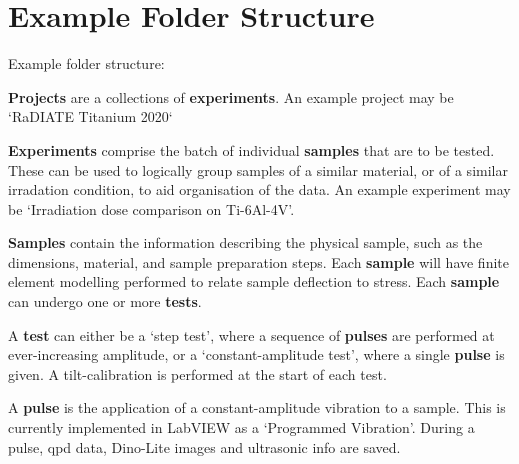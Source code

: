 \documentclass{article}
\begin{document}
\section{Example Folder Structure}

Example folder structure:


\begin{itemize}
  \item{
    \textbf{Projects} are a collections of \textbf{experiments}.
    An example project may be `RaDIATE Titanium 2020`
  }
  \item{
    \textbf{Experiments} comprise the batch of individual \textbf{samples} that are to be tested.
    These can be used to logically group samples of a similar material, or of a similar irradation condition, to aid organisation of the data.
    An example experiment may be `Irradiation dose comparison on Ti-6Al-4V'.
  }
  \item{
    \textbf{Samples} contain the information describing the physical sample, such as the dimensions, material, and sample preparation steps.
    Each \textbf{sample} will have finite element modelling performed to relate sample deflection to stress.
    Each \textbf{sample} can undergo one or more \textbf{tests}.
  }
  \item{
    A \textbf{test} can either be a `step test', where a sequence of \textbf{pulses} are performed at ever-increasing amplitude, or a `constant-amplitude test', where a single \textbf{pulse} is given.
    A tilt-calibration is performed at the start of each test.
  \item{
    A \textbf{pulse} is the application of a constant-amplitude vibration to a sample.
    This is currently implemented in LabVIEW as a `Programmed Vibration'.
    During a pulse, qpd data, Dino-Lite images and ultrasonic info are saved. 
  }
  }
\end{itemize}
\end{document}
